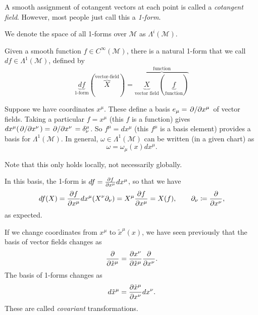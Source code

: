 \begin{definition}[1-forms]
  A smooth assignment of cotangent vectors at each point is called a \emph{cotangent field}. However, most people just call this a \emph{1-form}.
\end{definition}

\begin{notation}
  We denote the space of all 1-forms over $\mathcal{M}$ as $\Lambda^i (\mathcal{M})$.
\end{notation}

\begin{definition}[]
  Given a smooth function $f \in C^\infty (\mathcal{M})$, there is a natural 1-form that we call $df \in \Lambda^1 (\mathcal{M})$, defined by
  \begin{equation}
    \underbrace{df}_{\text{1-form}}(\overbrace{X}^{\text{vector-field}}) = \overbrace{\underbrace{X}_{\text{vector field}} (\underbrace{f}_{\text{function}})}^{\text{function}}
  \end{equation}
\end{definition}

\begin{example}[]
  Suppose we have coordinates $x^\mu$. These define a basis $e_\mu = \pdv*{}{x^\mu}$ of vector fields.
  Taking a particular $f = x^\mu$ (this $f$ is a function) gives $dx^\mu(\pdv*{}{x^\nu}) = \pdv*{}{x^\nu} (x^\mu) = \delta^\mu_\nu$.
  So $f^\mu = dx^\mu$ (this $f^\mu$ is a basis element) provides a basis for $\Lambda^1(\mathcal{M})$. In general, $\omega \in \Lambda^1 (\mathcal{M})$ can be written (in a given chart) as 
  \begin{equation}
    \omega = \omega_\mu(x) dx^\mu.
  \end{equation}
  \begin{leftbar}
    \begin{remark}
      Note that this only holds locally, not necessarily globally.
    \end{remark}
  \end{leftbar}

  In this basis, the 1-form is $df = \pdv{f}{x^\mu} dx^\mu$, so that we have
  \begin{equation}
    df(X) = \pdv{f}{x^\mu} dx^\mu (X^\nu \partial_\nu) = X^\mu \pdv{f}{x^\mu} = X(f), \qquad \partial_\nu \coloneqq \pdv{}{x^\nu},
  \end{equation}
  as expected.
\end{example}

If we change coordinates from $x^\mu$ to $\tilde x^\mu(x)$, we have seen previously that the basis of vector fields changes as
\begin{equation}
  \pdv{}{\tilde x^\mu} = \pdv{x^\nu}{\tilde x^\mu} \pdv{}{x^\nu}.
\end{equation}
The basis of 1-forms changes as
\begin{equation}
  d\tilde x^\mu = \pdv{\tilde x^\mu}{x^\nu} d x^\nu.
\end{equation}
These are called \emph{covariant} transformations.

